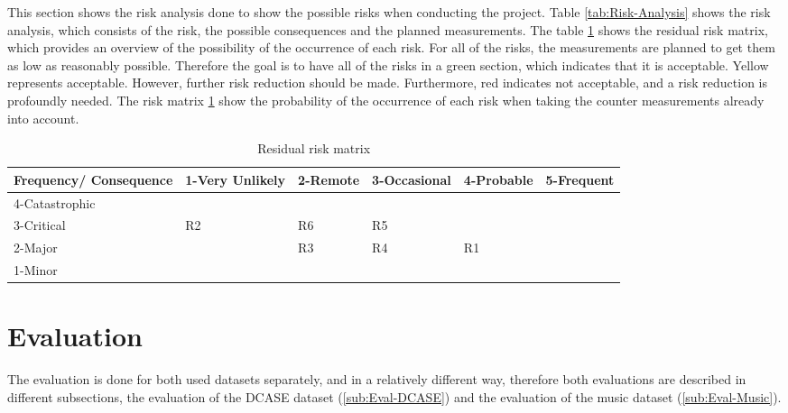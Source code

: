 \noindent
This section shows the risk analysis done to show the possible risks when conducting the project. Table \ref{tab:Risk-Analysis} shows the risk analysis, which consists of the risk, the possible consequences and the planned measurements. The table \ref{tab:Risk-Matrix} shows the residual risk matrix, which provides an overview of the possibility of the occurrence of each risk. For all of the risks, the measurements are planned to get them as low as reasonably possible. Therefore the goal is to have all of the risks in a green section, which indicates that it is acceptable. Yellow represents acceptable. However, further risk reduction should be made. Furthermore, red indicates not acceptable, and a risk reduction is profoundly needed. The risk matrix \ref{tab:Risk-Matrix} show the probability of the occurrence of each risk when taking the counter measurements already into account.

\clearpage
{}

\begin{table}[htb]
\centering
\scriptsize
\caption{Residual risk matrix}
\label{tab:Risk-Matrix}
\begin{tabular}{|p{2cm}|p{2cm}|p{2cm}| p{2cm} |p{2cm}| p{2cm}|}
    \hline Frequency/ Consequence & 1-Very Unlikely & 2-Remote & 3-Occasional & 4-Probable & 5-Frequent\\ [10pt]
    \hline 4-Catastrophic & \cellcolor{yellow!50} & \cellcolor{red!50} & \cellcolor{red!50} & \cellcolor{red!50} &\cellcolor{red!50} \\ [10pt]
    \hline 3-Critical & R2 \cellcolor{green!50} & R6 \cellcolor{yellow!50} & R5\cellcolor{yellow!50} & \cellcolor{red!50} &\cellcolor{red!50} \\ [10pt]
    \hline 2-Major & \cellcolor{green!50} & R3 \cellcolor{green!50} & R4 \cellcolor{yellow!50} & R1 \cellcolor{yellow!50} &\cellcolor{red!50} \\ [10pt]
    \hline 1-Minor & \cellcolor{green!50} & \cellcolor{green!50} & \cellcolor{green!50} &\cellcolor{yellow!50} &\cellcolor{yellow!50} \\ [10pt]
    \hline
\end{tabular}
\end{table}

\section{Evaluation}
\label{sec:Evaluation}
The evaluation is done for both used datasets separately, and in a relatively different way, therefore both evaluations are described in different subsections, the evaluation of the DCASE dataset (\ref{sub:Eval-DCASE}) and the evaluation of the music dataset (\ref{sub:Eval-Music}).

